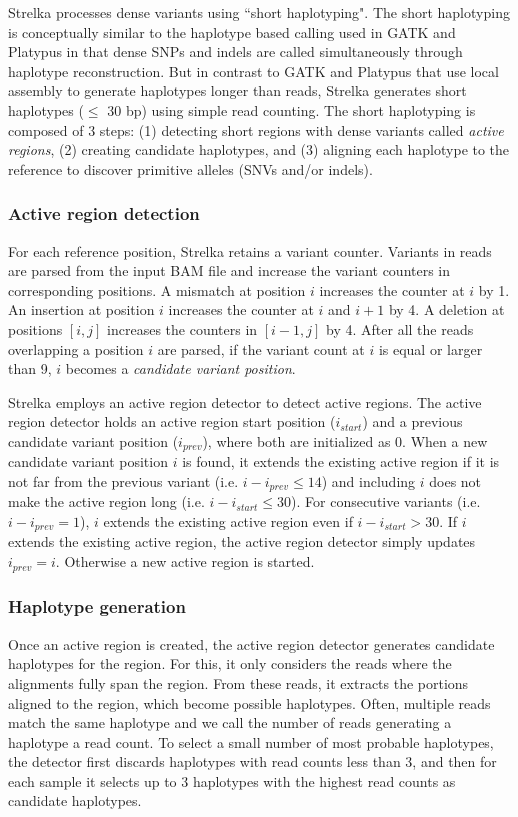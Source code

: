 \documentclass{article}
\begin{document}
Strelka processes dense variants using ``short haplotyping". The short haplotyping is conceptually similar to the haplotype based calling used in GATK and Platypus in that dense SNPs and indels are called simultaneously through haplotype reconstruction. But in contrast to GATK and Platypus that use local assembly to generate haplotypes longer than reads, Strelka generates short haplotypes ($\leq$ 30 bp) using simple read counting. The short haplotyping is composed of 3 steps: (1) detecting short regions with dense variants called {\em active regions}, (2) creating candidate haplotypes, and (3) aligning each haplotype to the reference to discover primitive alleles (SNVs and/or indels).

\subsubsection{Active region detection}
For each reference position, Strelka retains a variant counter. Variants in reads are parsed from the input BAM file and increase the variant counters in corresponding positions. A mismatch at position $i$ increases the counter at $i$ by 1. An insertion at position $i$ increases the counter at $i$ and $i+1$ by 4. A deletion at positions $[i,j]$ increases the counters in $[i-1,j]$ by 4.
After all the reads overlapping a position $i$ are parsed, if the variant count at $i$ is equal or larger than 9, $i$ becomes a {\em candidate variant position}.

Strelka employs an active region detector to detect active regions. The active region detector holds an active region start position ($i_{start}$) and a previous candidate variant position ($i_{prev}$), where both are initialized as 0. When a new candidate variant position $i$ is found, it extends the existing active region if it is not far from the previous variant (i.e. $i - i_{prev} \leq 14$) and including $i$ does not make the active region long (i.e. $i - i_{start} \leq 30$). For consecutive variants (i.e. $i - i_{prev} = 1$), $i$ extends the existing active region even if $i - i_{start} > 30$. If $i$ extends the existing active region, the active region detector simply updates $i_{prev} = i$. Otherwise a new active region is started.

\subsubsection{Haplotype generation}
Once an active region is created, the active region detector generates candidate haplotypes for the region. For this, it only considers the reads where the alignments fully span the region. From these reads, it extracts the portions aligned to the region, which become possible haplotypes. Often, multiple reads match the same haplotype and we call the number of reads generating a haplotype a read count. To select a small number of most probable haplotypes, the detector first discards haplotypes with read counts less than 3, and then for each sample it selects up to 3 haplotypes with the highest read counts as candidate haplotypes.
\end{document}
